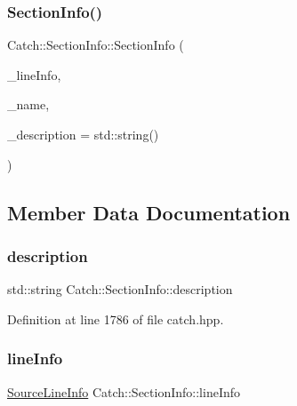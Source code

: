 \subsubsection{\texorpdfstring{Section\+Info()}{SectionInfo()}}
{\footnotesize\ttfamily Catch\+::\+Section\+Info\+::\+Section\+Info (\begin{DoxyParamCaption}\item[{\mbox{\hyperlink{struct_catch_1_1_source_line_info}{Source\+Line\+Info}} const \&}]{\+\_\+line\+Info,  }\item[{std\+::string const \&}]{\+\_\+name,  }\item[{std\+::string const \&}]{\+\_\+description = {\ttfamily std\+:\+:string()} }\end{DoxyParamCaption})}



\subsection{Member Data Documentation}
\mbox{\label{struct_catch_1_1_section_info_a0052060219a6de74bb7ade34d4163a4e}} 
\subsubsection{\texorpdfstring{description}{description}}
{\footnotesize\ttfamily std\+::string Catch\+::\+Section\+Info\+::description}



Definition at line 1786 of file catch.\+hpp.

\mbox{\label{struct_catch_1_1_section_info_adbc83b8a3507c4acc8ee249e93465711}} 
\subsubsection{\texorpdfstring{line\+Info}{lineInfo}}
{\footnotesize\ttfamily \mbox{\hyperlink{struct_catch_1_1_source_line_info}{Source\+Line\+Info}} Catch\+::\+Section\+Info\+::line\+Info}



